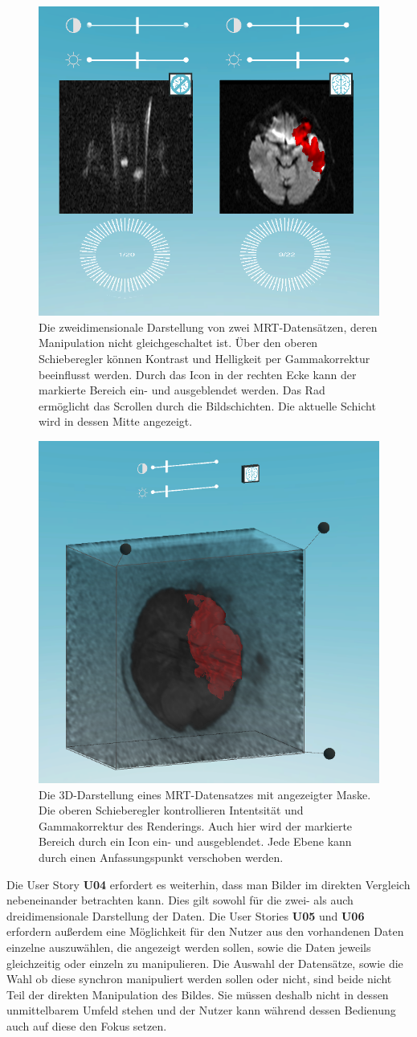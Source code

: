 \begin{figure}[!htb]
	\centering
	\includegraphics[width=0.5\linewidth]{images/mARt2d.png}
	\caption{Die zweidimensionale Darstellung von zwei MRT-Datensätzen, deren Manipulation nicht gleichgeschaltet ist. Über den oberen Schieberegler können Kontrast und Helligkeit per Gammakorrektur beeinflusst werden. Durch das Icon in der rechten Ecke kann der markierte Bereich ein- und ausgeblendet werden. Das Rad ermöglicht das Scrollen durch die Bildschichten. Die aktuelle Schicht wird in dessen Mitte angezeigt. }
	\label{img:mARt2d}
\end{figure}
\FloatBarrier

\begin{figure}[!htb]
	\centering
	\includegraphics[width=0.5\linewidth]{images/mARt3d.png}
	\caption{Die 3D-Darstellung eines MRT-Datensatzes mit angezeigter Maske. Die oberen Schieberegler kontrollieren Intentsität und Gammakorrektur des Renderings. Auch hier wird der markierte Bereich durch ein Icon ein- und ausgeblendet. Jede Ebene kann durch einen Anfassungspunkt verschoben werden.}
	\label{img:mARt3d}
\end{figure}
\FloatBarrier

Die User Story \textbf{U04} erfordert es weiterhin, dass man Bilder im direkten Vergleich nebeneinander betrachten kann. Dies gilt sowohl für die zwei- als auch dreidimensionale Darstellung der Daten. Die User Stories \textbf{U05} und \textbf{U06} erfordern außerdem eine Möglichkeit für den Nutzer aus den vorhandenen Daten einzelne auszuwählen, die angezeigt werden sollen, sowie die Daten jeweils gleichzeitig oder einzeln zu manipulieren. 
Die Auswahl der Datensätze, sowie die Wahl ob diese synchron manipuliert werden sollen oder nicht, sind beide nicht Teil der direkten Manipulation des Bildes. Sie müssen deshalb nicht in dessen unmittelbarem Umfeld stehen und der Nutzer kann während dessen Bedienung auch auf diese den Fokus setzen.
 
